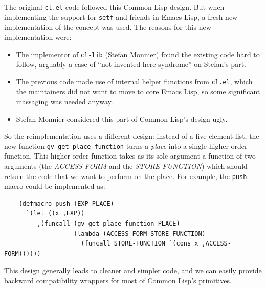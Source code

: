 \documentclass[format=acmsmall,screen]{acmart}
\newcommand \Elisp {Emacs Lisp}
\begin{document}
The original \texttt{cl.el} code followed this Common Lisp design.  But when
implementing the support for \texttt{setf} and friends in \Elisp{}, a fresh
new implementation of the concept was used.  The reasons for this new
implementation were:
\begin{itemize}
\item The implementor of \texttt{cl-lib} (Stefan Monnier) found the existing
  code hard to follow, arguably a case of
  ``not-invented-here syndrome'' on Stefan's part.
\item The previous code made use of internal helper functions from
  \texttt{cl.el}, which the maintainers did not want to move to core \Elisp,
  so some significant massaging was needed anyway.
\item Stefan Monnier considered this part of Common Lisp's
  design ugly.
\end{itemize}
So the reimplementation uses a different design: instead of a five element
list, the new function \texttt{gv-get-place-function} turns
a \emph{place}  into a single higher-order function.
This higher-order function takes as its sole argument a function
of two arguments (the \textsl{ACCESS-FORM} and the \textsl{STORE-FUNCTION})
which should return the code that we want to perform on the place.
For example, the \texttt{push} macro could be implemented as:
\begin{verbatim}
    (defmacro push (EXP PLACE)
      `(let ((x ,EXP))
         ,(funcall (gv-get-place-function PLACE)
                   (lambda (ACCESS-FORM STORE-FUNCTION)
                     (funcall STORE-FUNCTION `(cons x ,ACCESS-FORM))))))
\end{verbatim}
This design generally leads to cleaner and simpler code, and we can easily
provide backward compatibility wrappers for most of Common Lisp's
primitives.
\end{document}
